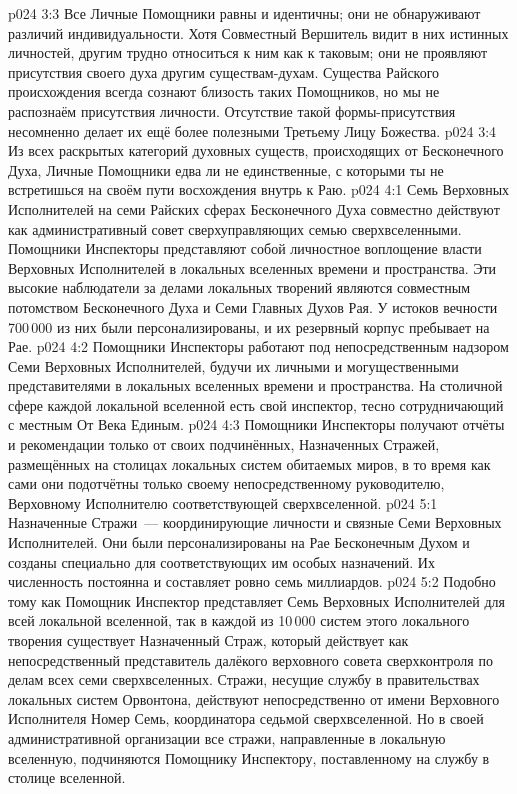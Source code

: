 \vs p024 3:3 Все Личные Помощники равны и идентичны; они не обнаруживают различий индивидуальности. Хотя Совместный Вершитель видит в них истинных личностей, другим трудно относиться к ним как к таковым; они не проявляют присутствия своего духа другим существам\hyp{}духам. Существа Райского происхождения всегда сознают близость таких Помощников, но мы не распознаём присутствия личности. Отсутствие такой формы\hyp{}присутствия несомненно делает их ещё более полезными Третьему Лицу Божества.
\vs p024 3:4 Из всех раскрытых категорий духовных существ, происходящих от Бесконечного Духа, Личные Помощники едва ли не единственные, с которыми ты не встретишься на своём пути восхождения внутрь к Раю.
\vs p024 4:1 Семь Верховных Исполнителей на семи Райских сферах Бесконечного Духа совместно действуют как административный совет сверхуправляющих семью сверхвселенными. Помощники Инспекторы представляют собой личностное воплощение власти Верховных Исполнителей в локальных вселенных времени и пространства. Эти высокие наблюдатели за делами локальных творений являются совместным потомством Бесконечного Духа и Семи Главных Духов Рая. У истоков вечности 700\,000 из них были персонализированы, и их резервный корпус пребывает на Рае.
\vs p024 4:2 Помощники Инспекторы работают под непосредственным надзором Семи Верховных Исполнителей, будучи их личными и могущественными представителями в локальных вселенных времени и пространства. На столичной сфере каждой локальной вселенной есть свой инспектор, тесно сотрудничающий с местным От Века Единым.
\vs p024 4:3 Помощники Инспекторы получают отчёты и рекомендации только от своих подчинённых, Назначенных Стражей, размещённых на столицах локальных систем обитаемых миров, в то время как сами они подотчётны только своему непосредственному руководителю, Верховному Исполнителю соответствующей сверхвселенной.
\vs p024 5:1 Назначенные Стражи~--- координирующие личности и связные Семи Верховных Исполнителей. Они были персонализированы на Рае Бесконечным Духом и созданы специально для соответствующих им особых назначений. Их численность постоянна и составляет ровно семь миллиардов.
\vs p024 5:2 Подобно тому как Помощник Инспектор представляет Семь Верховных Исполнителей для всей локальной вселенной, так в каждой из 10\,000 систем этого локального творения существует Назначенный Страж, который действует как непосредственный представитель далёкого верховного совета сверхконтроля по делам всех семи сверхвселенных. Стражи, несущие службу в правительствах локальных систем Орвонтона, действуют непосредственно от имени Верховного Исполнителя Номер Семь, координатора седьмой сверхвселенной. Но в своей административной организации все стражи, направленные в локальную вселенную, подчиняются Помощнику Инспектору, поставленному на службу в столице вселенной.
